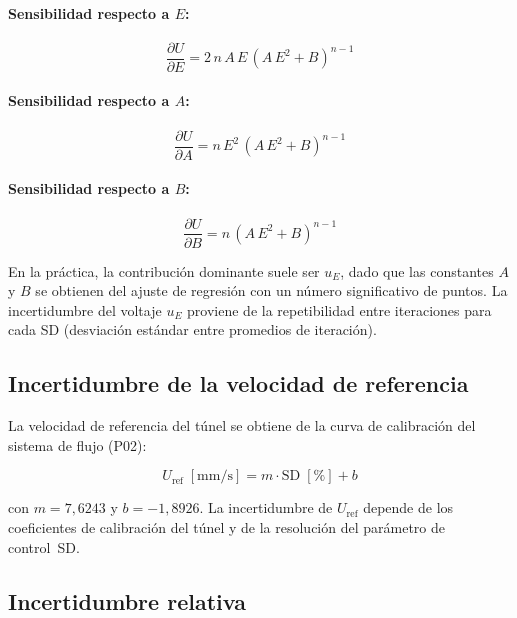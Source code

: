 \documentclass[12pt,a4paper]{article}
\begin{document}
\paragraph{Sensibilidad respecto a $E$:}
\begin{equation}
	\frac{\partial U}{\partial E}
	= 2\,n\,A\,E\,(A\,E^2 + B)^{n-1}
	\label{eq:dU_dE}
\end{equation}

\paragraph{Sensibilidad respecto a $A$:}
\begin{equation}
	\frac{\partial U}{\partial A}
	= n\,E^2\,(A\,E^2 + B)^{n-1}
	\label{eq:dU_dA}
\end{equation}

\paragraph{Sensibilidad respecto a $B$:}
\begin{equation}
	\frac{\partial U}{\partial B}
	= n\,(A\,E^2 + B)^{n-1}
	\label{eq:dU_dB}
\end{equation}

En la práctica, la contribución dominante suele ser $u_E$, dado que las
constantes $A$ y $B$ se obtienen del ajuste de regresión con un número
significativo de puntos.  La incertidumbre del voltaje $u_E$ proviene de la
repetibilidad entre iteraciones para cada SD (desviación estándar entre
promedios de iteración).

\subsection{Incertidumbre de la velocidad de referencia}

La velocidad de referencia del túnel se obtiene de la curva de calibración
del sistema de flujo (P02):

\begin{equation}
	U_\mathrm{ref}\;[\text{mm/s}] = m \cdot \mathrm{SD}\;[\%] + b
	\label{eq:U_ref}
\end{equation}

con $m = 7{,}6243$ y $b = -1{,}8926$.  La incertidumbre de $U_\mathrm{ref}$
depende de los coeficientes de calibración del túnel y de la resolución del
parámetro de control~SD.

\subsection{Incertidumbre relativa}
\end{document}
